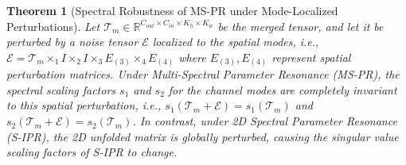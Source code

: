 \documentclass{article}
\theoremstyle{plain}
\newtheorem{theorem}{Theorem}[section]
\theoremstyle{definition}
\theoremstyle{remark}
\begin{document}
\begin{theorem}[Spectral Robustness of MS-PR under Mode-Localized Perturbations]
Let $\mathcal{T}_m \in \mathbb{R}^{C_{out} \times C_{in} \times K_h \times K_w}$ be the merged tensor, and let it be perturbed by a noise tensor $\mathcal{E}$ localized to the spatial modes, i.e., $\mathcal{E} = \mathcal{T}_m \times_1 I \times_2 I \times_3 E_{(3)} \times_4 E_{(4)}$ where $E_{(3)}, E_{(4)}$ represent spatial perturbation matrices. Under Multi-Spectral Parameter Resonance (MS-PR), the spectral scaling factors $s_1$ and $s_2$ for the channel modes are completely invariant to this spatial perturbation, i.e., $s_1(\mathcal{T}_m + \mathcal{E}) = s_1(\mathcal{T}_m)$ and $s_2(\mathcal{T}_m + \mathcal{E}) = s_2(\mathcal{T}_m)$. In contrast, under 2D Spectral Parameter Resonance (S-IPR), the 2D unfolded matrix is globally perturbed, causing the singular value scaling factors of S-IPR to change.
\end{theorem}
\end{document}
